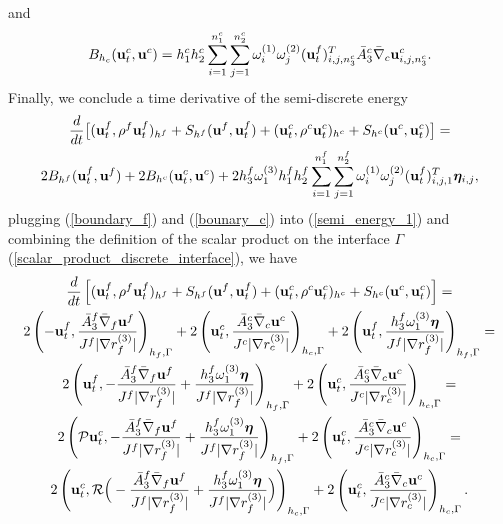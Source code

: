 \documentclass[a4paper]{article}
\begin{document}
and 
\begin{equation}\label{bounary_c}
B_{h_c} ({\bf u}_t^c,{\bf u}^c) = h_1^ch_2^c\sum_{i = 1}^{ n_1^c}\sum_{j=1}^{n_2^c}\omega_i^{(1)}\omega_j^{(2)}({\bf u}_t^f)^T_{i,j,n_3^c}\bar{A}_3^c\bar{\nabla}_c{\bf u}^c_{i,j,n_3^c}.
\end{equation}
Finally, we conclude a time derivative of the semi-discrete energy
\begin{multline}\label{semi_energy_1}
\frac{d}{dt}\big[({\bf u}_t^f,\rho^f {\bf u}_t^f)_{h^f} + S_{h^f}({\bf u}^f,{\bf u}^f_t) + ({\bf u}_t^c,\rho^c {\bf u}_t^c)_{h^c} + S_{h^c}({\bf u}^c,{\bf u}^c_t) \big]  = \\
2B_{h^f}({\bf u}_t^f,{\bf u}^f) + 2B_{h^c}({\bf u}_t^c,{\bf u}^c) + 2h_3^f\omega_1^{(3)}h_1^f h_2^f\sum_{i=1}^{n_1^f}\sum_{j=1}^{n_2^f}\omega_i^{(1)}\omega_j^{(2)}({\bf u}_t^f)^T_{i,j,1}{\bm \eta}_{i,j},
\end{multline}
plugging (\ref{boundary_f}) and (\ref{bounary_c}) into (\ref{semi_energy_1}) and combining the definition of the scalar product on the interface $\Gamma$ (\ref{scalar_product_discrete_interface}), we have
\begin{multline}\label{semi_energy_2}
\frac{d}{dt}\left[({\bf u}_t^f,\rho^f {\bf u}_t^f)_{h^f} + S_{h^f}({\bf u}^f,{\bf u}^f_t) + ({\bf u}_t^c,\rho^c {\bf u}_t^c)_{h^c} + S_{h^c}({\bf u}^c,{\bf u}^c_t) \right]  = \\
2\left(-{\bf u}_t^f,\frac{\bar{A}_3^f\bar{\nabla}_f{\bf u}^f}{J^f|\nabla r_f^{(3)}|}\right)_{h_f,\Gamma} + 2\left({\bf u}_t^c,\frac{\bar{A}_3^c\bar{\nabla}_c{\bf u}^c}{J^c|\nabla r_c^{(3)}|}\right)_{h_c,\Gamma} + 2\left({\bf u}_t^f,\frac{h_3^f\omega_1^{(3)}{\bm \eta}}{J^f|\nabla r_f^{(3)}|}\right)_{h_f,\Gamma} = \\
2\left({\bf u}_t^f,-\frac{\bar{A}_3^f\bar{\nabla}_f{\bf u}^f}{J^f|\nabla r_f^{(3)}|} + \frac{h_3^f\omega_1^{(3)}{\bm \eta}}{J^f|\nabla r_f^{(3)}|}\right)_{h_f,\Gamma} +  2\left({\bf u}_t^c,\frac{\bar{A}_3^c\bar{\nabla}_c{\bf u}^c}{J^c|\nabla r_c^{(3)}|}\right)_{h_c,\Gamma} = \\
2\left(\mathcal{P}{\bf u}^c_t,-\frac{\bar{A}_3^f\bar{\nabla}_f{\bf u}^f}{J^f|\nabla r_f^{(3)}|} + \frac{h_3^f\omega_1^{(3)}{\bm \eta}}{J^f|\nabla r_f^{(3)}|}\right)_{h_f,\Gamma} + 2\left({\bf u}_t^c,\frac{\bar{A}_3^c\bar{\nabla}_c{\bf u}^c}{J^c|\nabla r_c^{(3)}|}\right)_{h_c,\Gamma} = \\
2\left({\bf u}_t^c,\mathcal{R}\Big(-\frac{\bar{A}_3^f\bar{\nabla}_f{\bf u}^f}{J^f|\nabla r_f^{(3)}|} + \frac{h_3^f\omega_1^{(3)}{\bm \eta}}{J^f|\nabla r_f^{(3)}|}\Big)\right)_{h_c,\Gamma} + 2\left({\bf u}_t^c,\frac{\bar{A}_3^c\bar{\nabla}_c{\bf u}^c}{J^c|\nabla r_c^{(3)}|}\right)_{h_c,\Gamma}.
\end{multline}
\end{document}
